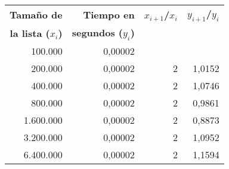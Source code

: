 \centering%
\begin{center}
\begin{tabular}{||r|r|r|r||}
\hline \hline
{\bf Tamaño de } & {\bf Tiempo en } & {\bf $x_{i+1}$/$x_i$} & {\bf $y_{i+1}$/$y_i$} \\
{\bf la lista ($x_i$)} & {\bf segundos ($y_i$)} &  &  \\
\hline \hline
   100.000 &    0,00002 &            &            \\
\hline
   200.000 &    0,00002 &          2 &     1,0152 \\
\hline
   400.000 &    0,00002 &          2 &     1,0746 \\
\hline
   800.000 &    0,00002 &          2 &     0,9861 \\
\hline
 1.600.000 &    0,00002 &          2 &     0,8873 \\
\hline
 3.200.000 &    0,00002 &          2 &     1,0952 \\
\hline
 6.400.000 &    0,00002 &          2 &     1,1594 \\
\hline
\hline
\end{tabular}
%
\end{center}
